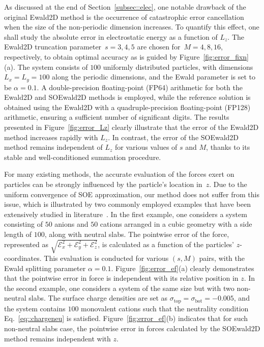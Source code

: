 As discussed at the end of Section~\ref{subsec::elec}, one notable drawback of the original Ewald2D method is the occurrence of catastrophic error cancellation when the size of the non-periodic dimension increases. 
To quantify this effect, one shall study the absolute error in electrostatic energy as a function of $L_z$. 
The Ewald2D truncation parameter~$s= 3, 4, 5$ are chosen for~$M = 4, 8, 16$, respectively, to obtain optimal accuracy as is guided by Figure~\ref{fig:error_fixn} (a).
The system consists of $100$ uniformly distributed particles, with dimensions $L_x = L_y = 100$ along the periodic dimensions, and the Ewald parameter is set to be $\alpha = 0.1$.
A double-precision floating-point (FP64) arithmetic for both the Ewald2D and SOEwald2D methods is employed, while the reference solution is obtained using the Ewald2D with a quadruple-precision floating-point (FP128) arithmetic, ensuring a sufficient number of significant digits. 
The results presented in Figure~\ref{fig:error_Lz} clearly illustrate that the error of the Ewald2D method increases rapidly with $L_z$.
In contrast, the error of the SOEwald2D method remains independent of $L_z$ for various values of $s$ and $M$, thanks to its stable and well-conditioned summation procedure.

For many existing methods, the accurate evaluation of the forces exert on particles can be strongly influenced by the particle's location in~$z$. 
Due to the uniform convergence of SOE approximation, our method does not suffer from this issue, which is illustrated by two commonly employed examples that have been extensively studied in literature~\cite{lindbo2012fast,de2002electrostatics}. 
In the first example, one considers a system consisting of $50$ anions and $50$ cations arranged in a cubic geometry with a side length of $100$, along with neutral slabs.  
The pointwise error of the force, represented as $\sqrt{\mathscr{E}_{x}^2+\mathscr{E}_{y}^2+\mathscr{E}_{z}^2}$,  is calculated as a function of the particles' $z$-coordinates. 
This evaluation is conducted for various $(s,M)$ pairs, with the Ewald splitting parameter $\alpha=0.1$. 
Figure~\ref{fig:error_ef}(a) clearly demonstrates that the pointwise error in force is independent with its relative position in $z$. 
In the second example, one considers a system of the same size but with two non-neutral slabs. 
The surface charge densities are set as $\sigma_{\mathrm{top}} = \sigma_{\mathrm{bot}} = -0.005$, and the system contains $100$ monovalent cations such that the neutrality condition Eq.~\eqref{eq::chargeneu} is satisfied. 
Figure~\ref{fig:error_ef}(b) indicates that for such non-neutral slabs case, the pointwise error in forces calculated by the SOEwald2D method remains independent with $z$.

